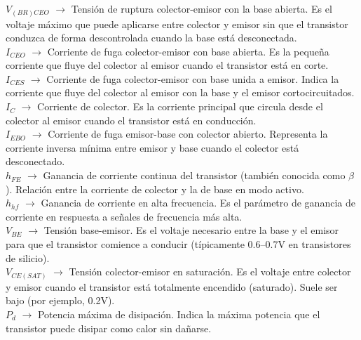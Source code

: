 
\textbf{$V_{(BR)CEO}$} $\rightarrow$ Tensión de ruptura colector-emisor con la base abierta. Es el voltaje máximo que puede aplicarse entre colector y emisor sin que el transistor conduzca de forma descontrolada cuando la base está desconectada. \\

\textbf{$I_{CEO}$} $\rightarrow$ Corriente de fuga colector-emisor con base abierta. Es la pequeña corriente que fluye del colector al emisor cuando el transistor está en corte. \\

\textbf{$I_{CES}$} $\rightarrow$ Corriente de fuga colector-emisor con base unida a emisor. Indica la corriente que fluye del colector al emisor con la base y el emisor cortocircuitados. \\

\textbf{$I_{C}$} $\rightarrow$ Corriente de colector. Es la corriente principal que circula desde el colector al emisor cuando el transistor está en conducción. \\

\textbf{$I_{EBO}$} $\rightarrow$ Corriente de fuga emisor-base con colector abierto. Representa la corriente inversa mínima entre emisor y base cuando el colector está desconectado. \\

\textbf{$h_{FE}$} $\rightarrow$ Ganancia de corriente continua del transistor (también conocida como $\beta$). Relación entre la corriente de colector y la de base en modo activo. \\

\textbf{$h_{hf}$} $\rightarrow$ Ganancia de corriente en alta frecuencia. Es el parámetro de ganancia de corriente en respuesta a señales de frecuencia más alta. \\

\textbf{$V_{BE}$} $\rightarrow$ Tensión base-emisor. Es el voltaje necesario entre la base y el emisor para que el transistor comience a conducir (típicamente 0.6–0.7V en transistores de silicio). \\

\textbf{$V_{CE(SAT)}$} $\rightarrow$ Tensión colector-emisor en saturación. Es el voltaje entre colector y emisor cuando el transistor está totalmente encendido (saturado). Suele ser bajo (por ejemplo, 0.2V). \\

\textbf{$P_d$} $\rightarrow$ Potencia máxima de disipación. Indica la máxima potencia que el transistor puede disipar como calor sin dañarse. \\

